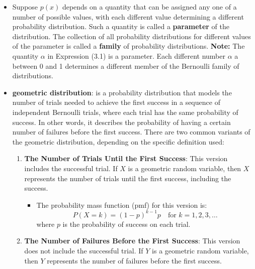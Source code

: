 \documentclass{report}
\begin{document}
\begin{itemize}
    \item Suppose $p(x)$ depends on a quantity that can be assigned any one of a number
        of possible values, with each different value determining a different probability distribution. Such a quantity is called a \textbf{parameter} of the distribution. The
        collection of all probability distributions for different values of the parameter
        is called a \textbf{family} of probability distributions.
        \bigbreak \noindent 
        \textbf{Note:} The quantity $\alpha$ in Expression (3.1) is a parameter. Each different number $\alpha$ a between 0 and 1 determines a different member of the Bernoulli family of distributions.
    \item \textbf{geometric distribution}: is a probability distribution that models the number of trials needed to achieve the first success in a sequence of independent Bernoulli trials, where each trial has the same probability of success. In other words, it describes the probability of having a certain number of failures before the first success.
        \bigbreak \noindent 
        There are two common variants of the geometric distribution, depending on the specific definition used:
        \begin{enumerate}
            \item \textbf{The Number of Trials Until the First Success}: This version includes the successful trial. If \( X \) is a geometric random variable, then \( X \) represents the number of trials until the first success, including the success.

                \begin{itemize}
                    \item The probability mass function (pmf) for this version is:
                        \[
                            P(X = k) = (1 - p)^{k-1} p \quad \text{for } k = 1, 2, 3, \ldots
                        \]
                        where \( p \) is the probability of success on each trial.
                \end{itemize}

            \item \textbf{The Number of Failures Before the First Success}: This version does not include the successful trial. If \( Y \) is a geometric random variable, then \( Y \) represents the number of failures before the first success.


\end{enumerate}
\end{itemize}
\end{document}

